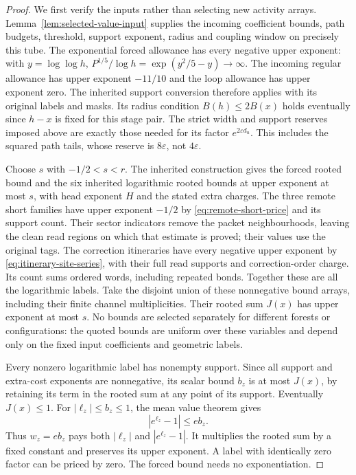 \begin{proof}
We first verify the inputs rather than selecting new activity arrays.
Lemma~\ref{lem:selected-value-input} supplies the incoming coefficient
bounds, path budgets, threshold, support exponent, radius and coupling
window on precisely this tube. The exponential forced allowance has
every negative upper exponent: with $y=\log\log h$,
$P^{1/5}/\log h=\exp(y^2/5-y)\to\infty$.
The incoming regular allowance has upper exponent $-11/10$ and the
loop allowance has upper exponent zero. The inherited support conversion
therefore applies with its original labels and masks. Its radius condition
$B(h)\le2B(x)$ holds eventually since $h-x$ is fixed for this stage pair.
The strict width and support reserves imposed above are exactly those
needed for its factor $e^{2\varepsilon d_u}$. This includes the squared
path tails, whose reserve is $8\varepsilon$, not $4\varepsilon$.

Choose $s$ with $-1/2<s<r$. The inherited construction gives the forced
rooted bound and the six inherited logarithmic rooted bounds at upper
exponent at most $s$, with head exponent $H$ and the stated extra
charges. The three remote short families have upper exponent $-1/2$
by \eqref{eq:remote-short-price} and its support count. Their sector
indicators remove the packet neighbourhoods, leaving the clean read
regions on which that estimate is proved; their values use the original
tags. The correction itineraries have every negative upper exponent by
\eqref{eq:itinerary-site-series}, with their full read supports and
correction-order charge. Its count sums ordered words, including repeated
bonds. Together these are all the logarithmic labels. Take the disjoint
union of these nonnegative bound arrays, including their finite channel
multiplicities. Their rooted sum $J(x)$ has upper exponent at most $s$.
No bounds are selected separately for different forests or configurations:
the quoted bounds are uniform over these variables and depend only on
the fixed input coefficients and geometric labels.

Every nonzero logarithmic label has nonempty support. Since all support
and extra-cost exponents are nonnegative, its scalar bound $b_z$ is at
most $J(x)$, by retaining its term in the rooted sum at any point of its
support. Eventually $J(x)\le1$. For $|\ell_z|\le b_z\le1$, the mean
value theorem gives
\[
                  |e^{\ell_z}-1|\le e b_z.
\]
Thus $w_z=e b_z$ pays both $|\ell_z|$ and $|e^{\ell_z}-1|$.
It multiplies the rooted sum by a fixed constant and preserves its upper
exponent. A label with identically zero factor can be priced by zero.
The forced bound needs no exponentiation.


\end{proof}
